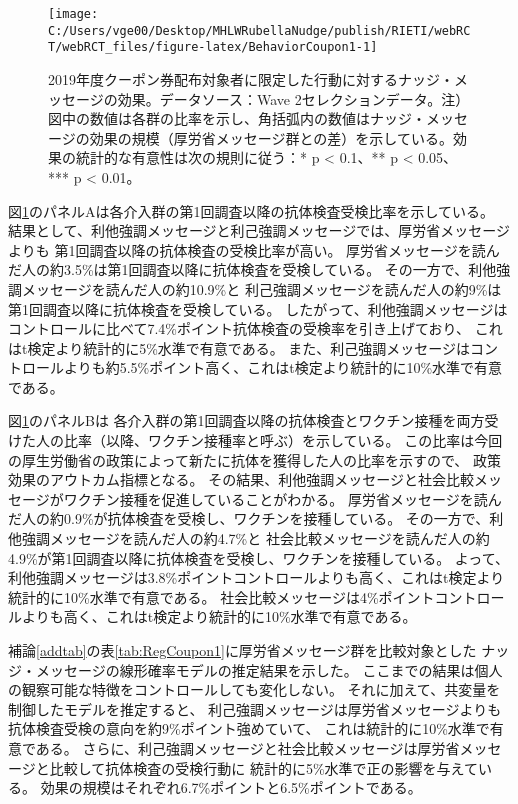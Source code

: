 \documentclass[
  11pt,
  a4paper,
]{article}
\begin{document}
\begin{figure}[t]
\texttt{[image: C:/Users/vge00/Desktop/MHLWRubellaNudge/publish/RIETI/webRCT/webRCT\_files/figure-latex/BehaviorCoupon1-1]} \caption{2019年度クーポン券配布対象者に限定した行動に対するナッジ・メッセージの効果。データソース：Wave 2セレクションデータ。注）図中の数値は各群の比率を示し、角括弧内の数値はナッジ・メッセージの効果の規模（厚労省メッセージ群との差）を示している。効果の統計的な有意性は次の規則に従う：* p < 0.1、** p < 0.05、*** p < 0.01。}\label{fig:BehaviorCoupon1}
\end{figure}

図\ref{fig:BehaviorCoupon1}のパネルAは各介入群の第1回調査以降の抗体検査受検比率を示している。
結果として、利他強調メッセージと利己強調メッセージでは、厚労省メッセージよりも
第1回調査以降の抗体検査の受検比率が高い。
厚労省メッセージを読んだ人の約3.5\%は第1回調査以降に抗体検査を受検している。
その一方で、利他強調メッセージを読んだ人の約10.9\%と
利己強調メッセージを読んだ人の約9\%は第1回調査以降に抗体検査を受検している。
したがって、利他強調メッセージはコントロールに比べて7.4\%ポイント抗体検査の受検率を引き上げており、
これはt検定より統計的に5\%水準で有意である。
また、利己強調メッセージはコントロールよりも約5.5\%ポイント高く、これはt検定より統計的に10\%水準で有意である。

図\ref{fig:BehaviorCoupon1}のパネルBは
各介入群の第1回調査以降の抗体検査とワクチン接種を両方受けた人の比率（以降、ワクチン接種率と呼ぶ）を示している。
この比率は今回の厚生労働省の政策によって新たに抗体を獲得した人の比率を示すので、
政策効果のアウトカム指標となる。
その結果、利他強調メッセージと社会比較メッセージがワクチン接種を促進していることがわかる。
厚労省メッセージを読んだ人の約0.9\%が抗体検査を受検し、ワクチンを接種している。
その一方で、利他強調メッセージを読んだ人の約4.7\%と
社会比較メッセージを読んだ人の約4.9\%が第1回調査以降に抗体検査を受検し、ワクチンを接種している。
よって、利他強調メッセージは3.8\%ポイントコントロールよりも高く、これはt検定より統計的に10\%水準で有意である。
社会比較メッセージは4\%ポイントコントロールよりも高く、これはt検定より統計的に10\%水準で有意である。

補論\ref{addtab}の表\ref{tab:RegCoupon1}に厚労省メッセージ群を比較対象とした
ナッジ・メッセージの線形確率モデルの推定結果を示した。
ここまでの結果は個人の観察可能な特徴をコントロールしても変化しない。
それに加えて、共変量を制御したモデルを推定すると、
利己強調メッセージは厚労省メッセージよりも抗体検査受検の意向を約9\%ポイント強めていて、
これは統計的に10\%水準で有意である。
さらに、利己強調メッセージと社会比較メッセージは厚労省メッセージと比較して抗体検査の受検行動に
統計的に5\%水準で正の影響を与えている。
効果の規模はそれぞれ6.7\%ポイントと6.5\%ポイントである。
\end{document}
